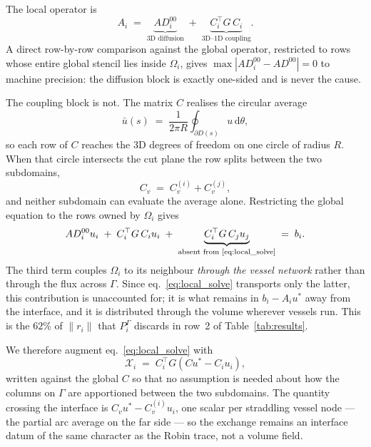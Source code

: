 The local operator is
\begin{equation}
  A_i \;=\; \underbrace{AD^{00}_i}_{\text{3D diffusion}}
          \;+\; \underbrace{C_i^\top G\, C_i}_{\text{3D--1D coupling}} .
\end{equation}
A direct row-by-row comparison against the global operator, restricted to rows
whose entire global stencil lies inside $\Omega_i$, gives
$\max|AD^{00}_i - AD^{00}| = 0$ to machine precision: the diffusion block is
exactly one-sided and is never the cause.

The coupling block is not. The matrix $C$ realises the circular average
\begin{equation}
  \bar u(s) \;=\; \frac{1}{2\pi R}\oint_{\partial D(s)} u \, \mathrm{d}\theta ,
\end{equation}
so each row of $C$ reaches the 3D degrees of freedom on one circle of radius $R$.
When that circle intersects the cut plane the row splits between the two
subdomains,
\begin{equation}
  C_v \;=\; C_v^{(i)} + C_v^{(j)} ,
\end{equation}
and neither subdomain can evaluate the average alone. Restricting the global
equation to the rows owned by $\Omega_i$ gives
\begin{equation}
  AD^{00}_i u_i \;+\; C_i^\top G\, C_i u_i
  \;+\; \underbrace{C_i^\top G\, C_j u_j}_{\text{absent from \eqref{eq:local_solve}}}
  \;=\; b_i .
  \label{eq:truelocal}
\end{equation}
The third term couples $\Omega_i$ to its neighbour \emph{through the vessel
network} rather than through the flux across $\Gamma$. Since
eq.~\eqref{eq:local_solve} transports only the latter, this contribution is
unaccounted for; it is what remains in $b_i - A_i u^*$ away from the interface,
and it is distributed through the volume wherever vessels run. This is the
$62\%$ of $\|r_i\|$ that $P_i^\Gamma$ discards in row~2 of
Table~\ref{tab:results}.

We therefore augment eq.~\eqref{eq:local_solve} with
\begin{equation}
  \mathcal{X}_i \;=\; C_i^\top G \left( C u^* - C_i u_i \right),
  \label{eq:cross}
\end{equation}
written against the global $C$ so that no assumption is needed about how the
columns on $\Gamma$ are apportioned between the two subdomains. The quantity
crossing the interface is $C_v u^* - C_v^{(i)} u_i$, one scalar per straddling
vessel node --- the partial arc average on the far side --- so the exchange
remains an interface datum of the same character as the Robin trace, not a
volume field.

